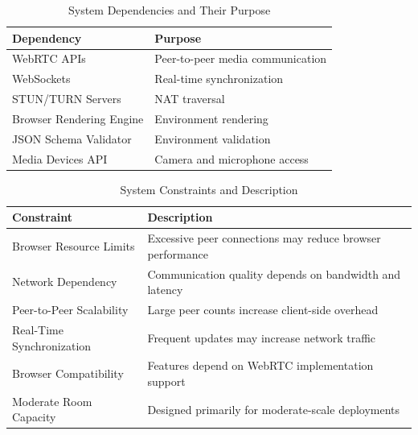 \documentclass[12pt]{article}
\begin{document}
\begin{table}[h!]
\centering
\renewcommand{\arraystretch}{1.5}
\begin{tabular}{|p{6cm}|p{8cm}|}
\hline
\textbf{Dependency} & \textbf{Purpose} \\ 
\hline

WebRTC APIs & Peer-to-peer media communication \\ 
\hline

WebSockets & Real-time synchronization \\ 
\hline

STUN/TURN Servers & NAT traversal \\ 
\hline

Browser Rendering Engine & Environment rendering \\ 
\hline

JSON Schema Validator & Environment validation \\ 
\hline

Media Devices API & Camera and microphone access \\ 
\hline

\end{tabular}
\caption{System Dependencies and Their Purpose}

\end{table}

\begin{table}[h!]
\centering
\renewcommand{\arraystretch}{1.5}
\begin{tabular}{|p{6cm}|p{8cm}|}
\hline
\textbf{Constraint} & \textbf{Description} \\ 
\hline

Browser Resource Limits & Excessive peer connections may reduce browser performance \\ 
\hline

Network Dependency & Communication quality depends on bandwidth and latency \\ 
\hline

Peer-to-Peer Scalability & Large peer counts increase client-side overhead \\ 
\hline

Real-Time Synchronization & Frequent updates may increase network traffic \\ 
\hline

Browser Compatibility & Features depend on WebRTC implementation support \\ 
\hline

Moderate Room Capacity & Designed primarily for moderate-scale deployments \\ 
\hline

\end{tabular}
\caption{System Constraints and Description}

\end{table}
\end{document}
